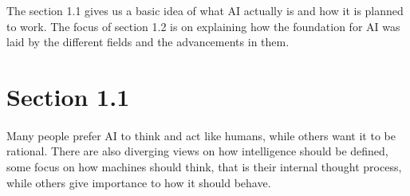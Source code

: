 \documentclass{article}
\begin{document}
















The section 1.1 gives us a basic idea of what AI actually is and how it is planned to work. The focus of section 1.2 is on explaining how the foundation for AI was laid by the different fields and the advancements in them. \cite{ai2020}

\section{Section 1.1}
\paragraph{}
	Many people prefer AI to think and act like humans, while others want it to be rational.
	There are also diverging views on how intelligence should be defined, some focus on how machines should think, that is their internal thought process, while others give importance to how it should behave.
\end{document}
